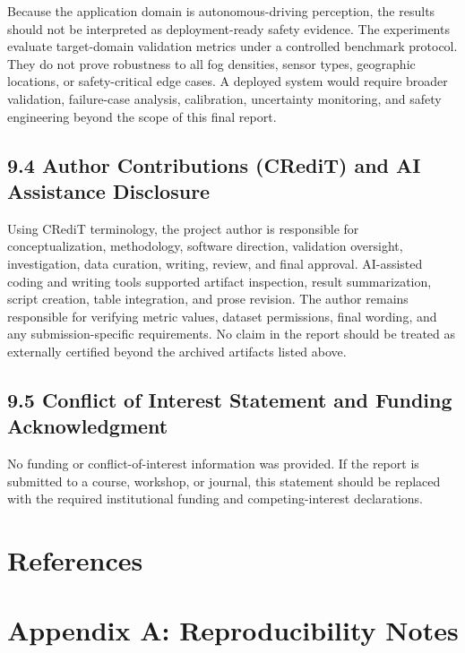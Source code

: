 \documentclass[
  11pt,
]{article}
\begin{document}
Because the application domain is autonomous-driving perception, the
results should not be interpreted as deployment-ready safety evidence.
The experiments evaluate target-domain validation metrics under a
controlled benchmark protocol. They do not prove robustness to all fog
densities, sensor types, geographic locations, or safety-critical edge
cases. A deployed system would require broader validation, failure-case
analysis, calibration, uncertainty monitoring, and safety engineering
beyond the scope of this final report.

\hypertarget{author-contributions-credit-and-ai-assistance-disclosure}{%
\subsection{9.4 Author Contributions (CRediT) and AI Assistance
Disclosure}\label{author-contributions-credit-and-ai-assistance-disclosure}}

Using CRediT terminology, the project author is responsible for
conceptualization, methodology, software direction, validation
oversight, investigation, data curation, writing, review, and final
approval. AI-assisted coding and writing tools supported artifact
inspection, result summarization, script creation, table integration,
and prose revision. The author remains responsible for verifying metric
values, dataset permissions, final wording, and any submission-specific
requirements. No claim in the report should be treated as externally
certified beyond the archived artifacts listed above.

\hypertarget{conflict-of-interest-statement-and-funding-acknowledgment}{%
\subsection{9.5 Conflict of Interest Statement and Funding
Acknowledgment}\label{conflict-of-interest-statement-and-funding-acknowledgment}}

No funding or conflict-of-interest information was provided. If the
report is submitted to a course, workshop, or journal, this statement
should be replaced with the required institutional funding and
competing-interest declarations.

\hypertarget{references}{%
\section{References}\label{references}}

\hypertarget{appendix-a-reproducibility-notes}{%
\section{Appendix A: Reproducibility
Notes}\label{appendix-a-reproducibility-notes}}
\end{document}
